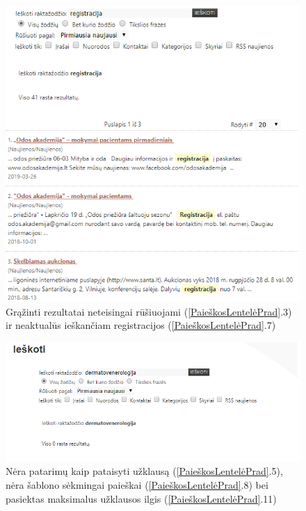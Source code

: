\documentclass{VUMIFPSkursinis}
\begin{document}
\begin{figure}[H]
    \centering
    \includegraphics[scale=0.8]{img/BlogaPaieška}
    \caption{Grąžinti rezultatai neteisingai rūšiuojami (\ref{PaieškosLentelėPrad}.3) ir neaktualūs ieškančiam registracijos (\ref{PaieškosLentelėPrad}.7)}
    \label{img:blogapaieška}
\end{figure}

\begin{figure}[H]
    \centering
    \includegraphics[scale=0.8]{img/TuščiaPaieška}
    \caption{Nėra patarimų kaip pataisyti užklausą (\ref{PaieškosLentelėPrad}.5), nėra šablono sėkmingai paieškai (\ref{PaieškosLentelėPrad}.8) bei pasiektas maksimalus užklausos ilgis (\ref{PaieškosLentelėPrad}.11)}
    \label{img:tuščiapaieška}
\end{figure}
\end{document}
